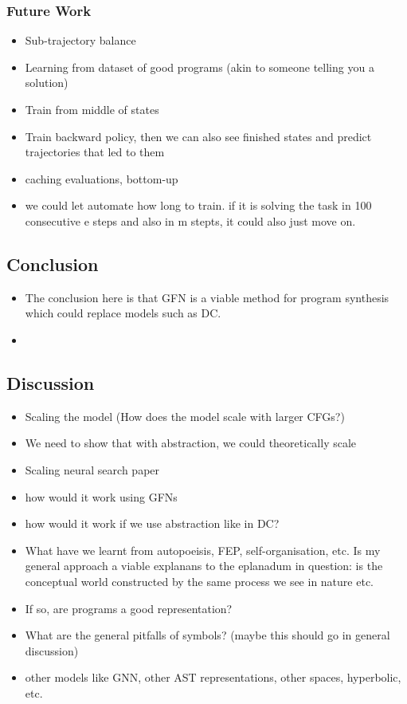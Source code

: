 \subsubsection{Future Work}
\begin{itemize}
    \item Sub-trajectory balance
    \item Learning from dataset of good programs (akin to someone telling you a solution)
    \item Train from middle of states
    \item Train backward policy, then we can also see finished states and predict trajectories that led to them
    \item caching evaluations, bottom-up
    \item we could let automate how long to train. if it is solving the task in 100 consecutive e steps and also in m stepts, it could also just move on. 

\end{itemize}












\subsection{Conclusion}
\begin{itemize}
    \item The conclusion here is that GFN is a viable method for program synthesis which could replace models such as DC. 
    \item 
\end{itemize}

\subsection{Discussion}
\begin{itemize}
    \item Scaling the model (How does the model scale with larger CFGs?)
    \item We need to show that with abstraction, we could theoretically scale
    \item Scaling neural search paper
    \item how would it work using GFNs
    \item how would it work if we use abstraction like in DC? 
    \item What have we learnt from autopoeisis, FEP, self-organisation, etc. Is my general approach a viable explanans to the eplanadum in question: is the conceptual world constructed by the same process we see in nature etc.
    \item If so, are programs a good representation?
    \item What are the general pitfalls of symbols?  (maybe this should go in general discussion)
    \item other models like GNN, other AST representations, other spaces, hyperbolic, etc. 
\end{itemize}



